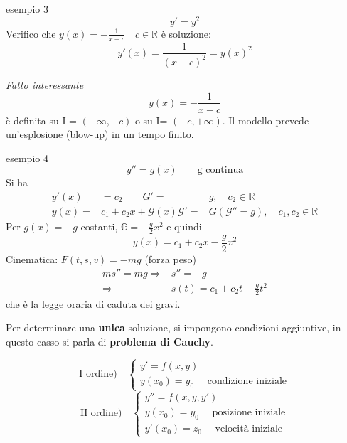\documentclass[x11names]{article}
\begin{document}
	\begin{es}{esempio 3}
		\[
		y' = y^2
		\]
		Verifico che $y(x) = - \frac{1}{x+c} \quad c \in \mathbb{R}$ è soluzione:
		\[
		y'(x) = \frac{1}{(x+c)^2} = y(x)^2
		\]
	
		\textit{Fatto interessante}
		\[
		y(x) = - \frac{1}{x+c}
		\]
		è definita su I = $(-\infty, -c)$ o su I= $(-c, + \infty)$.	Il modello prevede un'esplosione (blow-up) in un tempo finito.
	\end{es}
	\begin{es}{esempio 4}
		\[
		y'' = g(x) \qquad \text{g continua}
		\]
		Si ha
		\begin{align*}
			y'(x) &= c_2 \qquad G'=& g, \quad c_2 \in \mathbb{R} \\
			y(x) =& c_1 + c_2x + \mathcal{G}(x) \mathcal{G}' =& G (\mathcal{G}'' = g), \quad c_1, c_2 \in \mathbb{R}
		\end{align*}
		Per $g(x) = -g$ costanti, $\mathbb{G} = - \frac{g}{2}x^2$ e quindi
		\[
		y(x) = c_1 + c_2x - \frac{g}{2}x^2
		\]
		Cinematica: $F(t,s,v) = -mg$ (forza peso)
		\begin{align*}
			ms'' = mg \Longrightarrow & s'' = -g \\
			\Longrightarrow & s(t) = c_1 + c_2t - \frac{g}{2}t^2
		\end{align*}
		che è la legge oraria di caduta dei gravi.
	\end{es}
	
	
	\noindent
	Per determinare una \textbf{unica} soluzione, si impongono condizioni aggiuntive, in questo casso si parla di \textbf{problema di Cauchy}.
	
	\[
	\text{I ordine)} \quad \begin{cases}
		y' = f(x,y) \\
		y(x_0) = y_0 \quad \text{ condizione iniziale}
		\end{cases} 
	\]
	\[
	\text{II ordine)} \quad \begin{cases}
		y'' = f(x,y,y') \\
		y(x_0) = y_0 \quad \text{ posizione iniziale} \\
		y'(x_0) = z_0 \quad \text{ velocità iniziale}
 	\end{cases} 
	\]
	
\end{document}
